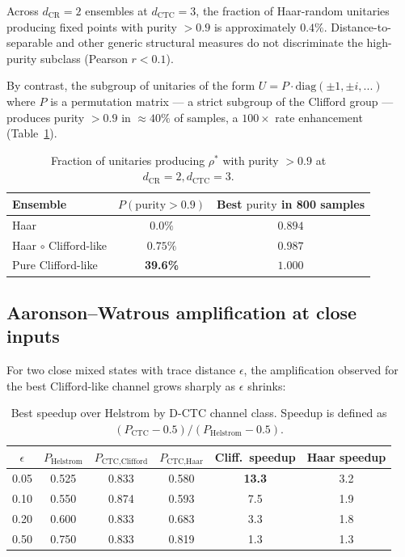 \documentclass[11pt,a4paper]{article}
\begin{document}
Across $d_{\text{CR}} = 2$ ensembles at $d_{\text{CTC}} = 3$, the
fraction of Haar-random unitaries producing fixed points with purity
$> 0.9$ is approximately $0.4\%$. Distance-to-separable and other
generic structural measures do not discriminate the high-purity
subclass (Pearson $r < 0.1$).

By contrast, the subgroup of unitaries of the form
$U = P \cdot \mathrm{diag}(\pm 1, \pm i, ...)$ where $P$ is a
permutation matrix --- a strict subgroup of the Clifford group ---
produces purity $> 0.9$ in $\approx 40\%$ of samples, a
$100\times$ rate enhancement (Table~\ref{tab:clifford-rate}).

\begin{table}[h]
\centering
\caption{Fraction of unitaries producing $\rho^*$ with purity $> 0.9$ at
$d_{\text{CR}} = 2, d_{\text{CTC}} = 3$.}
\label{tab:clifford-rate}
\begin{tabular}{lcc}
\toprule
Ensemble & $P(\mathrm{purity} > 0.9)$ & Best $\mathrm{purity}$ in 800 samples \\
\midrule
Haar & $0.0\%$ & $0.894$ \\
Haar $\circ$ Clifford-like & $0.75\%$ & $0.987$ \\
Pure Clifford-like & \textbf{39.6\%} & $1.000$ \\
\bottomrule
\end{tabular}
\end{table}

\subsection{Aaronson--Watrous amplification at close inputs}

For two close mixed states with trace distance $\epsilon$, the
amplification observed for the best Clifford-like channel grows
sharply as $\epsilon$ shrinks:

\begin{table}[h]
\centering
\caption{Best speedup over Helstrom by D-CTC channel class. Speedup
is defined as $(P_{\text{CTC}} - 0.5)/(P_{\text{Helstrom}} - 0.5)$.}
\label{tab:amplification}
\begin{tabular}{cccccc}
\toprule
$\epsilon$ & $P_{\text{Helstrom}}$ & $P_{\text{CTC,Clifford}}$ & $P_{\text{CTC,Haar}}$ &
Cliff.\ speedup & Haar speedup \\
\midrule
0.05 & 0.525 & 0.833 & 0.580 & \textbf{13.3} & 3.2 \\
0.10 & 0.550 & 0.874 & 0.593 & 7.5 & 1.9 \\
0.20 & 0.600 & 0.833 & 0.683 & 3.3 & 1.8 \\
0.50 & 0.750 & 0.833 & 0.819 & 1.3 & 1.3 \\
\bottomrule
\end{tabular}
\end{table}
\end{document}
